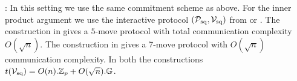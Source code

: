 : In this setting we use the
same commitment scheme as above. For the inner product argument we use the
interactive protocol $(\mathcal{P}_\mathrm{sq},\mathcal{V}_\mathrm{sq})$ from \cite{InnerProductDLS} or
\cite{Groth09b}. The construction in \cite{InnerProductDLS} gives a $5$-move
protocol with total communication complexity $O(\sqrt{n})$. The construction in
\cite{Groth09b} gives a 7-move protocol with $O(\sqrt{n})$ communication
complexity. In both the constructions $t(\mathcal{V}_\mathrm{sq}) = O(n).\mathbb{Z}_p +
O(\sqrt{n}).\mathbb{G}$.



